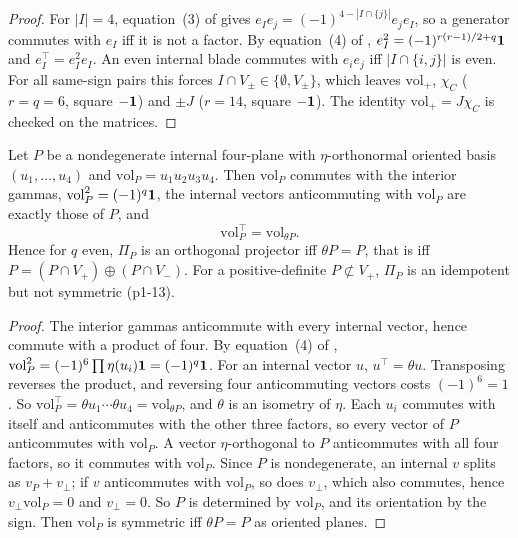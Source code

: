 \begin{proof}
For $|I|=4$, equation~(3) of \cite{ES17} gives $e_Ie_j=(-1)^{4-|I\cap\{j\}|}e_je_I$, so a generator commutes with $e_I$ iff it is not a factor. By equation~(4) of
\cite{ES17}, $e_I^2=(-1)^{r(r-1)/2+q}\mathbf 1$ and $e_I^{\!\top}=e_I^2e_I$. An even internal blade commutes with $e_ie_j$ iff $|I\cap\{i,j\}|$ is even. For all same-sign pairs this
forces $I\cap V_\pm\in\{\emptyset,V_\pm\}$, which leaves $\mathrm{vol}_+$, $\chi_C$ ($r=q=6$, square $-\mathbf 1$) and $\pm J$ ($r=14$, square $-\mathbf 1$). The
identity $\mathrm{vol}_+=J\chi_C$ is checked on the matrices.
\end{proof}

\begin{lemma}
\label{p1:lem:transpose}
Let $P$ be a nondegenerate internal four-plane with $\eta$-orthonormal oriented basis $(u_1,\dots,u_4)$ and $\mathrm{vol}_P=u_1u_2u_3u_4$. Then $\mathrm{vol}_P$ commutes with the
interior gammas, $\mathrm{vol}_P^2=(-1)^q\mathbf 1$, the internal vectors anticommuting with $\mathrm{vol}_P$ are exactly those of $P$, and
\[
\mathrm{vol}_P^{\!\top}=\mathrm{vol}_{\theta P}.
\]
Hence for $q$ even, $\Pi_P$ is an orthogonal projector iff $\theta P=P$, that is iff $P=(P\cap V_+)\oplus(P\cap V_-)$. For a positive-definite $P\not\subset V_+$, $\Pi_P$ is
an idempotent but not symmetric (p1-13).
\end{lemma}

\begin{proof}
The interior gammas anticommute with every internal vector, hence commute with a product of four. By equation~(4) of \cite{ES17}, $\mathrm{vol}_P^2=(-1)^6\prod\eta(u_i)\mathbf 1=(-1)^q\mathbf 1$.
For an internal vector $u$, $u^{\!\top}=\theta u$. Transposing reverses the product, and reversing four anticommuting vectors costs $(-1)^{6}=1$. So
$\mathrm{vol}_P^{\!\top}=\theta u_1\cdots\theta u_4=\mathrm{vol}_{\theta P}$, and $\theta$ is an isometry of $\eta$. Each $u_i$ commutes with itself and anticommutes with the other three
factors, so every vector of $P$ anticommutes with $\mathrm{vol}_P$. A vector $\eta$-orthogonal to $P$ anticommutes with all four factors, so it commutes with $\mathrm{vol}_P$. Since $P$ is
nondegenerate, an internal $v$ splits as $v_P+v_\perp$; if $v$ anticommutes with $\mathrm{vol}_P$, so does $v_\perp$, which also commutes, hence $v_\perp\mathrm{vol}_P=0$ and $v_\perp=0$.
So $P$ is determined by $\mathrm{vol}_P$, and its orientation by the sign. Then $\mathrm{vol}_P$ is symmetric iff $\theta P=P$ as oriented planes.
\end{proof}

